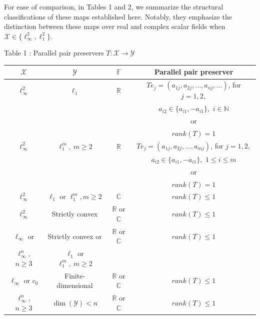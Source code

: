 \documentclass{amsart}
\theoremstyle{definition}
\theoremstyle{remark}
\numberwithin{equation}{section}
\begin{document}
   
   
   
   
    For ease of comparison, in  Tables 1 and 2, we summarize the structural classifications of these maps established here. Notably, they emphasize the distinction between these maps over real and complex scalar fields when $\mathcal{X}\in \{\ell_\infty^2,\ell_1^2\}.$ %
   \begin{center}
   	Table 1 : Parallel pair preservers $T:\mathcal{X}\to \mathcal{Y}$
   	\begin{tabular}{ |c|c|c|c|} 
   		\hline
   		$\mathcal{X}$ & $\mathcal{Y}$ & $\mathbb{F}$ & Parallel pair preserver\\ 
   		\hline 
   		$\ell_\infty^2$ & $\ell_1$   & $\mathbb{R}$& $Te_j=(a_{1j},a_{2j},\ldots,a_{nj},\ldots)$, for $j=1,2,$ \\
   		&&& $a_{i2}\in \{a_{i1},-a_{i1}\},$ $i\in \mathbb{N}$\\
   		&&& or \\
   		&&&$rank(T)=1$\\
   		\hline
   		$\ell_\infty^2$ &  $\ell_1^m,~m\geq 2$  & $\mathbb{R}$& $Te_j=(a_{1j},a_{2j},\ldots,a_{mj})$, for $j=1,2,$ \\
   		&&& $a_{i2}\in \{a_{i1},-a_{i1}\},$ $1\leq i\leq m$\\
   		&&& or \\
   		&&& $rank(T)=1$\\
   		\hline
   		$\ell_\infty^2$ &  $\ell_1$ or $\ell_1^m,m\geq 2$  & $\mathbb{C}$& $rank(T)\leq 1$\\
   		\hline
   		$\ell_\infty^2$ &  Strictly convex   & $\mathbb{R}$ or $\mathbb{C}$& $rank(T)\leq 1$\\
   		\hline
   		$\ell_\infty$ or  &  Strictly convex or   & $\mathbb{R}$ or $\mathbb{C}$& $rank(T)\leq 1$\\
   		$\ell_\infty^n,$ $n\geq 3$	&$\ell_1$ or  $\ell_1^m,~m\geq 2$&&\\
   		\hline
   		$\ell_\infty$ or $c_0$ &  Finite-dimensional   & $\mathbb{R}$ or $\mathbb{C}$& $rank(T)\leq 1$\\
   		\hline
   		$\ell_\infty^n,$ $n\geq 3$&  $\dim(\mathcal{Y})<n$   & $\mathbb{R}$ or $\mathbb{C}$& $rank(T)\leq 1$\\
   		\hline
   	\end{tabular}
   	
   \end{center}
\end{document}
